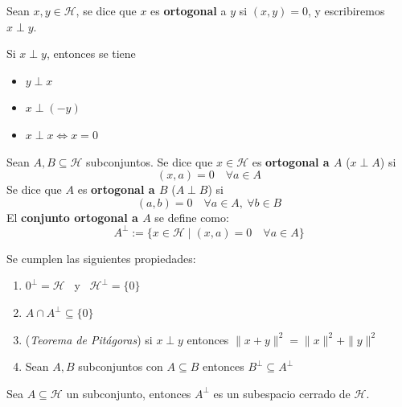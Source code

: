 \begin{definicion}
    Sean $x, y \in \mathcal{H}$, se dice que $x$ es \textbf{ortogonal} a $y$ si $(x, y) = 0$, y escribiremos $x \perp y$.
\end{definicion}

\begin{prop}
    Si $x \perp y$, entonces se tiene 
    \begin{itemize}
        \item[i)] $y \perp x$
        \item[ii)] $x \perp (-y)$
        \item[iii)] $x \perp x \iff x = 0$
    \end{itemize}
\end{prop}

\begin{definicion}
    Sean $A, B \subseteq \mathcal{H}$ subconjuntos. Se dice que $x \in \mathcal{H}$ es \textbf{ortogonal a $A$} ($x \perp A$) si 
    $$(x, a) = 0 \quad \forall a \in A$$ 
    \noindent
    Se dice que $A$ es \textbf{ortogonal a $B$} ($A \perp B$) si 
    $$(a, b) = 0 \quad \forall a \in A, \ \forall b \in B$$ 
    \noindent
    El \textbf{conjunto ortogonal a $A$} se define como:
    \[ A^\perp := \{ x \in \mathcal{H} \mid (x, a) = 0 \quad \forall a \in A \} \]
\end{definicion}

\begin{prop}\label{prop:ortogonalidad}
    Se cumplen las siguientes propiedades:
    \begin{enumerate}
        \item $0^{\perp} = \mathcal{H}$ \ y \ $\mathcal{H}^{\perp} = \{0\}$
        \item $A \cap A^{\perp} \subseteq \{0\}$
        \item (\textit{Teorema de Pitágoras}) si $x \perp y$ entonces $\|x + y\|^2 = \|x\|^2 + \|y\|^2$
        \item Sean $A, B$ subconjuntos con $A \subseteq B$ entonces $B^{\perp}\subseteq A^{\perp}$
    \end{enumerate}
\end{prop}

\begin{ejercicio}
    Sea $A \subseteq \mathcal{H}$ un subconjunto, entonces $A^{\perp}$ es un subespacio cerrado de $\mathcal{H}$. \\
\end{ejercicio}

